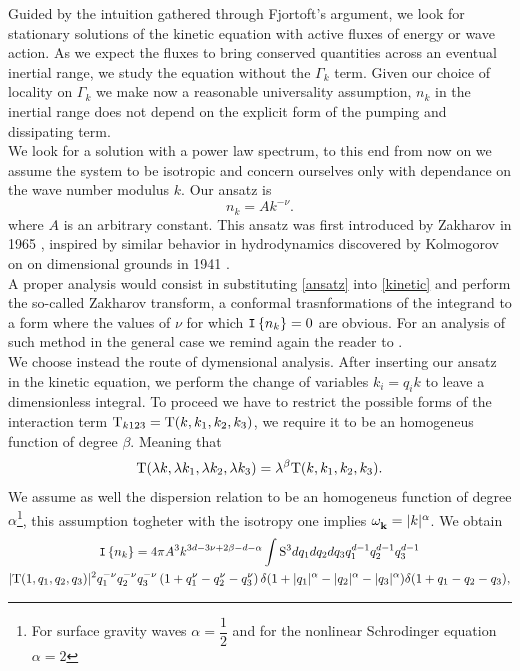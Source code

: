 Guided by the intuition gathered through Fjortoft's argument, we look for stationary solutions of the kinetic equation with active fluxes of energy or wave action. 
As we expect the fluxes to bring conserved quantities across an eventual inertial range, we study the equation without the $\Gamma_k$ term. Given our choice of locality
on $\Gamma_k$ we make now a reasonable universality assumption, $n_k$ in the inertial range does not depend on the explicit form of the pumping and dissipating term.\\
We look for a solution with a power law spectrum, to this end from now on we assume the system to be isotropic and concern ourselves only with dependance on the wave number 
modulus $k$. Our ansatz is  
\begin{equation}
    n_k = A k^{-\nu}.
    \label{ansatz}
\end{equation}
where $A$ is an arbitrary constant. 
This ansatz was first introduced by Zakharov in 1965 \cite{Zakharov1965}, inspired by similar behavior in hydrodynamics discovered by Kolmogorov on on dimensional grounds 
in 1941 \cite{1991}.\\
A proper analysis would consist in substituting \eqref{ansatz} into \eqref{kinetic} and perform the so-called Zakharov transform, a conformal trasnformations of the integrand to a form where 
the values of $\nu$ for which $\mathtt{I}\left\{n_k\right\}= 0$ are obvious. For an analysis of such method in the general case we remind again the reader to \cite{Zakharov}. \\
We choose instead the route of dymensional analysis. After inserting our ansatz in the kinetic equation, we perform the change of variables $k_i = q_i k$ to leave a 
dimensionless integral. To proceed we have to restrict the possible forms of the interaction term $\mathrm{T}_{k123} = \mathrm{T}(k, k_1, k_2, k_3) $, we require it to be an homogeneus 
function of degree $\beta$. Meaning that
\begin{equation}
    \mathrm{T}(\lambda k, \lambda k_1,\lambda k_2,\lambda k_3) = \lambda^\beta \mathrm{T}(k, k_1, k_2, k_3).
\end{equation}
We assume as well the dispersion relation to be an homogeneus function of degree $\alpha$\footnote{For surface gravity waves $\alpha = \dfrac{1}{2}$ and for the 
nonlinear Schrodinger equation $\alpha = 2$}, this assumption togheter with the isotropy one implies $\omega^{}_{\mathbf{k}} = |k|^{\alpha}$. We obtain 
\begin{multline}
    \mathtt{I}\left\{n_k\right\}= 4\pi A^3 k^{3d - 3\nu + 2\beta - d - \alpha} \int \mathrm{S}^3dq_1 dq_2 dq_3 q^{d-1}_1 q ^{d-1}_2 q^{d-1}_3 \\
    |\mathrm{T}(1, q_1, q_2, q_3)|^2 q_1^{-\nu}q_2^{-\nu}
    q_3^{-\nu}\left(1 + q_1^\nu - q_2^\nu - q_3^\nu \right) \delta (1 + |q_1|^\alpha - |q_2|^\alpha -|q_3|^\alpha)\delta(1 + q_1 - q_2 -q_3),
\end{multline} 
